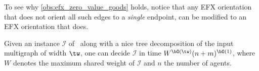 \documentclass[11pt,letterpaper]{article}
\begin{document}
To see why \cref{obs:efx_zero_value_goods} holds, notice that any EFX orientation that does not orient all such edges to a \emph{single} endpoint,
can be modified to an EFX orientation that does.

\begin{theoremrep}[\appsymb]\label{thm:EFX:tw}
    Given an instance $\mathcal{I}$ of \EFXmc\ along with a nice tree decomposition of the input multigraph of width $\tw$,
    one can decide $\mathcal{I}$ in time $W^{\bO(\tw)} (n + m)^{\bO(1)}$,
    where $W$ denotes the maximum shared weight of $\mathcal{I}$ and $n$ the number of agents.
\end{theoremrep}


\end{document}
